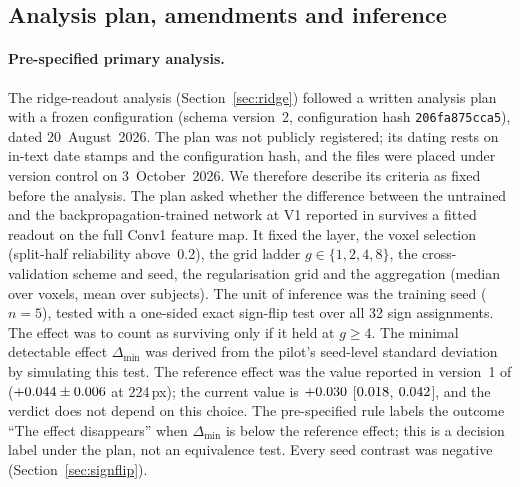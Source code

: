\subsection{Analysis plan, amendments and inference}
\label{sec:inference}

\paragraph{Pre-specified primary analysis.}
The ridge-readout analysis (Section~\ref{sec:ridge}) followed a written analysis plan
with a frozen configuration (schema version~2, configuration hash \texttt{206fa875cca5}),
dated 20~August~2026. The plan was not publicly registered; its dating rests on in-text
date stamps and the configuration hash, and the files were placed under version control
on 3~October~2026. We therefore describe its criteria as fixed before the analysis.
The plan asked whether the difference between the untrained and the backpropagation-trained network at V1 reported in \citet{evalres} survives a fitted readout on the full Conv1
feature map. It fixed the layer, the voxel selection (split-half reliability above~0.2),
the grid ladder $g \in \{1, 2, 4, 8\}$, the cross-validation scheme and seed, the
regularisation grid and the aggregation (median over voxels, mean over subjects). The
unit of inference was the training seed ($n = 5$), tested with a one-sided exact
sign-flip test over all 32 sign assignments. The effect was to count as surviving only
if it held at $g \geq 4$. The minimal detectable effect $\Delta_{\min}$ was derived from
the pilot's seed-level standard deviation by simulating this test. The reference effect
was the value reported in version~1 of \citet{evalres}
($+0.044 \pm 0.006$ at 224\,px); the current value is
$+0.030$ [$0.018$, $0.042$], and the verdict does not depend on this choice. The pre-specified rule labels the outcome ``The effect disappears'' when $\Delta_{\min}$ is below the reference effect; this is a decision label under the plan, not an equivalence test. Every seed contrast was negative (Section~\ref{sec:signflip}).

